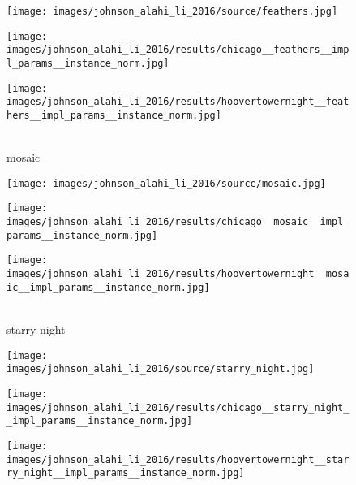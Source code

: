 \begin{figure}[H]
	\begin{minipage}[t]{0.3\textwidth}
		\centering
		\texttt{[image: images/johnson\_alahi\_li\_2016/source/feathers.jpg]}
	\end{minipage}
	\hfill%
	\begin{minipage}[t]{0.3\textwidth}
		\centering
		\texttt{[image: images/johnson\_alahi\_li\_2016/results/chicago\_\_feathers\_\_impl\_params\_\_instance\_norm.jpg]}
	\end{minipage}
	\hfill%
	\begin{minipage}[t]{0.3\textwidth}
		\centering
		\texttt{[image: images/johnson\_alahi\_li\_2016/results/hoovertowernight\_\_feathers\_\_impl\_params\_\_instance\_norm.jpg]}
	\end{minipage}
	
	\hfill \\ mosaic \hfill \\
	\begin{minipage}[t]{0.3\textwidth}
		\centering
		\texttt{[image: images/johnson\_alahi\_li\_2016/source/mosaic.jpg]}
	\end{minipage}
	\hfill%
	\begin{minipage}[t]{0.3\textwidth}
		\centering
		\texttt{[image: images/johnson\_alahi\_li\_2016/results/chicago\_\_mosaic\_\_impl\_params\_\_instance\_norm.jpg]}
	\end{minipage}
	\hfill%
	\begin{minipage}[t]{0.3\textwidth}
		\centering
		\texttt{[image: images/johnson\_alahi\_li\_2016/results/hoovertowernight\_\_mosaic\_\_impl\_params\_\_instance\_norm.jpg]}
	\end{minipage}
	\hfill \\ starry night \hfill \\
	\begin{minipage}[t]{0.3\textwidth}
		\centering
		\texttt{[image: images/johnson\_alahi\_li\_2016/source/starry\_night.jpg]}
	\end{minipage}
	\hfill%
	\begin{minipage}[t]{0.3\textwidth}
		\centering
		\texttt{[image: images/johnson\_alahi\_li\_2016/results/chicago\_\_starry\_night\_\_impl\_params\_\_instance\_norm.jpg]}
	\end{minipage}
	\hfill%
	\begin{minipage}[t]{0.3\textwidth}
		\centering
		\texttt{[image: images/johnson\_alahi\_li\_2016/results/hoovertowernight\_\_starry\_night\_\_impl\_params\_\_instance\_norm.jpg]}

\end{minipage}
\end{figure}
